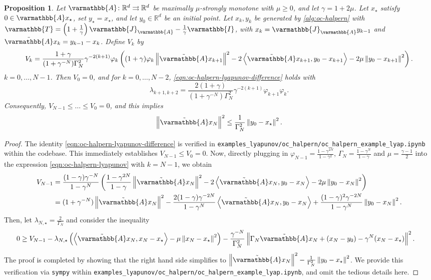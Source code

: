 \documentclass{article}
\theoremstyle{definition}
\theoremstyle{plain}
\newtheorem{proposition}{Proposition}
\newcommand{\reals}{\mathbb{R}}
\newcommand{\opA}{{\varmathbb{A}}}
\newcommand{\opI}{{\varmathbb{I}}}
\newcommand{\opJ}{{\varmathbb{J}}}
\newcommand{\opT}{{\varmathbb{T}}}
\newcommand{\inprod}[2]{\left\langle #1,#2 \right\rangle}
\newcommand{\sqnorm}[1]{\left\| #1 \right\|^2}
\newcommand{\topa}{\tilde{\opA}}
\begin{document}
\begin{proposition}
\label{proposition:oc-halpern}
Let $\opA\colon\reals^d\rightrightarrows\reals^d$ be maximally $\mu$-strongly monotone with $\mu\ge 0$, and let $\gamma=1+2\mu$.
Let $x_\star$ satisfy $0 \in \opA x_\star$, set $y_\star=x_\star$, and let $y_0\in\reals^d$ be an initial point.
Let $x_k,y_k$ be generated by \eqref{alg:oc-halpern} with $\opT = \left(1 + \frac{1}{\gamma}\right) \opJ_\opA - \frac{1}{\gamma} \opI$, with $x_k=\opJ_\opA y_{k-1}$ and $\topa x_k=y_{k-1}-x_k$.
Define $V_k$ by
\begin{align}
\label{eqn:oc-halpern-lyapunov}
    V_k
    =
    \frac{1+\gamma}{(1+\gamma^{-N})\Gamma_N^2}
    \gamma^{-2(k+1)}\varphi_k
    \left(
    (1+\gamma)\varphi_k\sqnorm{\topa x_{k+1}}
    -2\inprod{\topa x_{k+1}}{y_0-x_{k+1}}
    -2\mu\sqnorm{y_0-x_{k+1}}
    \right).
\end{align}
$k=0,\dots,N-1$.
Then $V_0=0$, and for $k=0,\dots,N-2$, \eqref{eqn:oc-halpern-lyapunov-difference} holds with
\[
    \lambda_{k+1,k+2}
    =
    \frac{2(1+\gamma)}{(1+\gamma^{-N})\Gamma_N^2}
    \gamma^{-2(k+1)}\varphi_{k+1}\varphi_k .
\]
Consequently, $V_{N-1}\le\dots\le V_0 = 0$, and this implies
\[
    \sqnorm{\topa x_N}\le \frac{1}{\Gamma_N^2}\sqnorm{y_0-x_\star}.
\]
\end{proposition}

\begin{proof}
The identity \eqref{eqn:oc-halpern-lyapunov-difference} is verified in \texttt{examples\_lyapunov/oc\_halpern/oc\_halpern\_example\_lyap.ipynb} within the codebase.
This immediately establishes $V_{N-1} \le V_0 = 0$.
Now, directly plugging in $\varphi_{N-1} = \frac{1-\gamma^{2N}}{1-\gamma^2}$, $\Gamma_N = \frac{1-\gamma^N}{1-\gamma}$ and $\mu = \frac{\gamma - 1}{2}$ into 
the expression \eqref{eqn:oc-halpern-lyapunov} with $k=N-1$, we obtain
\begin{align*}
    V_{N-1} & = \frac{(1-\gamma)\gamma^{-N}}{1-\gamma^N} \left( \frac{1-\gamma^{2N}}{1-\gamma} \sqnorm{\topa x_N} - 2\inprod{\topa x_{N}}{y_0-x_{N}} - 2\mu\sqnorm{y_0-x_{N}} \right) \\
    & = (1 + \gamma^{-N}) \sqnorm{\topa x_N} - \frac{2(1-\gamma)\gamma^{-2N}}{1-\gamma^N} \inprod{\topa x_{N}}{y_0-x_{N}} + \frac{(1-\gamma)^2 \gamma^{-2N}}{1-\gamma^N} \sqnorm{y_0-x_{N}} .
\end{align*}
Then, let $\lambda_{N,\star} = \frac{2}{\Gamma_N}$ and consider the inequality
\begin{align*}
    0 & \ge V_{N-1} - \lambda_{N,\star} \left(
    \inprod{\topa x_N}{x_N-x_\star}
    -\mu\sqnorm{x_N-x_\star}
    \right) - \frac{\gamma^{-N}}{\Gamma_N^2}
    \sqnorm{\Gamma_N \topa x_N+(x_N-y_0)-\gamma^N(x_N-x_\star)} .
\end{align*}
The proof is completed by showing that the right hand side simplifies to $\sqnorm{\topa x_N} - \frac{1}{\Gamma_N^2} \sqnorm{y_0 - x_\star}$.
We provide this verification via \texttt{sympy} within \texttt{examples\_lyapunov/oc\_halpern/oc\_halpern\_example\_lyap.ipynb}, and omit the tedious details here.
\end{proof}
\end{document}
